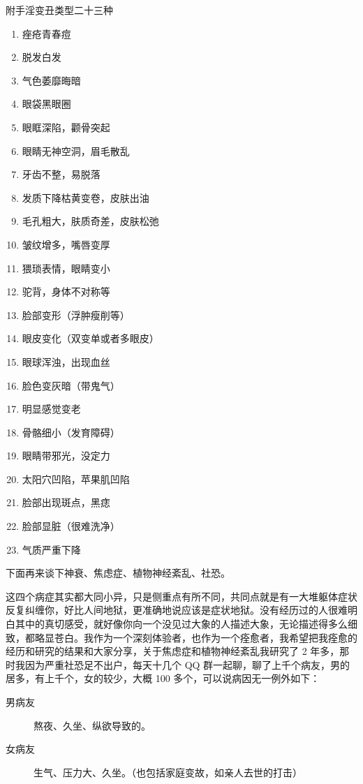 \documentclass[fontset=founder]{ctexart}
\begin{document}
附手淫变丑类型二十三种

\begin{enumerate}
    \item 痤疮青春痘
    \item 脱发白发
    \item 气色萎靡晦暗
    \item 眼袋黑眼圈
    \item 眼眶深陷，颧骨突起
    \item 眼睛无神空洞，眉毛散乱
    \item 牙齿不整，易脱落
    \item 发质下降枯黄变卷，皮肤出油
    \item 毛孔粗大，肤质奇差，皮肤松弛
    \item 皱纹增多，嘴唇变厚
    \item 猥琐表情，眼睛变小
    \item 驼背，身体不对称等
    \item 脸部变形（浮肿瘦削等）
    \item 眼皮变化（双变单或者多眼皮）
    \item 眼球浑浊，出现血丝
    \item 脸色变灰暗（带鬼气）
    \item 明显感觉变老
    \item 骨骼细小（发育障碍）
    \item 眼睛带邪光，没定力
    \item 太阳穴凹陷，苹果肌凹陷
    \item 脸部出现斑点，黑痣
    \item 脸部显脏（很难洗净）
    \item 气质严重下降
\end{enumerate}

下面再来谈下神衰、焦虑症、植物神经紊乱、社恐。

这四个病症其实都大同小异，只是侧重点有所不同，共同点就是有一大堆躯体症状反复纠缠你，好比人间地狱，更准确地说应该是症状地狱。没有经历过的人很难明白其中的真切感受，就好像你向一个没见过大象的人描述大象，无论描述得多么细致，都略显苍白。我作为一个深刻体验者，也作为一个痊愈者，我希望把我痊愈的经历和研究的结果和大家分享，关于焦虑症和植物神经紊乱我研究了 2 年多，那时我因为严重社恐足不出户，每天十几个 QQ 群一起聊，聊了上千个病友，男的居多，有上千个，女的较少，大概 100 多个，可以说病因无一例外如下：

\begin{description}
    \item[男病友] 熬夜、久坐、纵欲导致的。
    \item[女病友] 生气、压力大、久坐。（也包括家庭变故，如亲人去世的打击）
\end{description}
\end{document}
